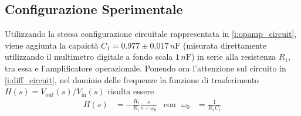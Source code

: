 \documentclass[a4paper,11pt]{article} %
\begin{document}
\subsection{Configurazione Sperimentale}
%
%
%
%

Utilizzando la stessa configurazione circuitale rappresentata in \autoref{i:opamp_circuit}, viene aggiunta la capaictà
$C_{1} = 0.977 \pm 0.017 \,\si{n\farad}$ (misurata direttamente utilizzando il multimetro digitale a fondo scala
$1\,\si{n\farad}$) in serie alla resistenza $R_{1}$, tra essa e l'amplificatore operazionale. Ponendo ora l'attenzione
sul circuito in \autoref{i:diff_circuit}, nel dominio delle frequenze
la funzione di trasferimento $H(s)=V_{\text{out}}(s)/V_{\text{in}}(s)$ risulta essere 
\begin{align}
	H(s) &= -\frac{R_{\text{f}}}{R_{1}}\frac{s}{s+\omega_{0}} & \text{con}\,\,\,\, \omega_{0}&=\frac{1}{R_{1}C_{1}}
\end{align}
\end{document}

